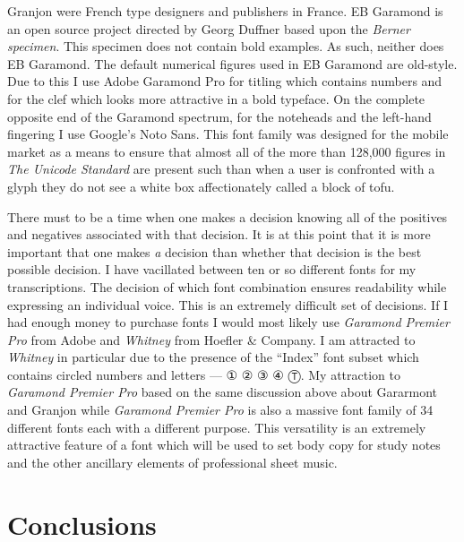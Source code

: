 \documentclass[nofonts,nobib]{tufte-handout}
\begin{document}
Granjon were French type designers and publishers in France. EB
Garamond is an open source project directed by Georg Duffner based
upon the \emph{Berner specimen}. This specimen does not contain bold
examples. As such, neither does EB Garamond. The default numerical
figures used in EB Garamond are old-style. Due to this I use Adobe
Garamond Pro for titling which contains numbers and for the clef which
looks more attractive in a bold typeface. On the complete opposite end
of the Garamond spectrum, for the noteheads and the left-hand
fingering I use Google's Noto Sans. This font family was designed for
the mobile market as a means to ensure that almost all of the more
than 128,000 figures in \emph{The Unicode Standard} are present such
than when a user is confronted with a glyph they do not see a white
box affectionately called a block of tofu.

There must to be a time when one makes a decision knowing all of the
positives and negatives associated with that decision. It is at this
point that it is more important that one makes \emph{a} decision than
whether that decision is the best possible decision. I have vacillated
between ten or so different fonts for my transcriptions. The decision
of which font combination ensures readability while expressing an
individual voice. This is an extremely difficult set of decisions. If
I had enough money to purchase fonts I would most likely use
\emph{Garamond Premier Pro} from Adobe and \emph{Whitney} from Hoefler
\& Company.\autocites{garamondPremier,hoeflerWhitney} I am attracted
to \emph{Whitney} in particular due to the presence of the ``Index''
font subset which contains circled numbers and letters ---
{\symbolfont① ② ③ ④ Ⓣ}. My attraction to \emph{Garamond Premier Pro}
based on the same discussion above about Gararmont and Granjon while
\emph{Garamond Premier Pro} is also a massive font family of 34
different fonts each with a different purpose. This versatility is an
extremely attractive feature of a font which will be used to set body
copy for study notes and the other ancillary elements of professional
sheet music.

\section{Conclusions}
\label{sec:conclusions}
\end{document}
